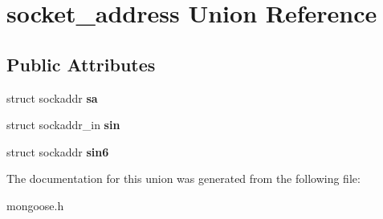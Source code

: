 \hypertarget{unionsocket__address}{}\section{socket\+\_\+address Union Reference}
\label{unionsocket__address}
\subsection*{Public Attributes}
\begin{DoxyCompactItemize}
\item 
\mbox{\label{unionsocket__address_ab6a9b0bc545e839df7e06e5b6bff0891}} 
struct sockaddr {\bfseries sa}
\item 
\mbox{\label{unionsocket__address_af540a7224ea459c48bc6ec1ca592e55d}} 
struct sockaddr\+\_\+in {\bfseries sin}
\item 
\mbox{\label{unionsocket__address_a923a2caba3cad046553b3632f7c2c571}} 
struct sockaddr {\bfseries sin6}
\end{DoxyCompactItemize}


The documentation for this union was generated from the following file\+:\begin{DoxyCompactItemize}
\item 
mongoose.\+h\end{DoxyCompactItemize}
